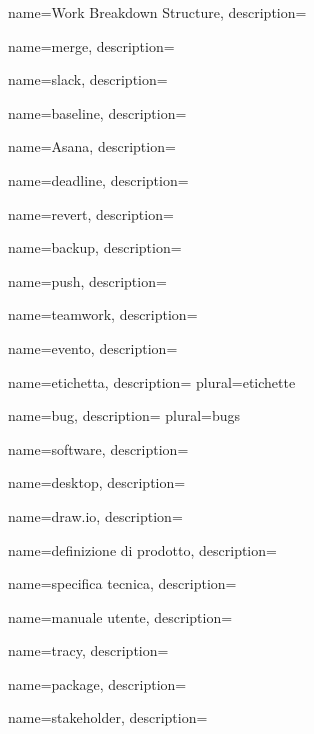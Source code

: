  {
	name=Work Breakdown Structure,
	description={\TODO{}}
}

 {
	name=merge,
	description={\TODO{}}
}

 {
	name=slack,
	description={\TODO{}}
}

 {
	name=baseline,
	description={\TODO{}}
}

 {
	name=Asana,
	description={\TODO{}}
}

 {
	name=deadline,
	description={\TODO{}}
}

 {
	name=revert,
	description={\TODO{}}
}

 {
	name=backup,
	description={\TODO{}}
}

 {
	name=push,
	description={\TODO{}}
}

 {
	name=teamwork,
	description={\TODO{}}
}

 {
	name=evento,
	description={\TODO{}}
}

 {
	name=etichetta,
	description={\TODO{}}
	plural=etichette
}

 {
	name=bug,
	description={\TODO{}}
	plural=bugs
}

 {
	name=software,
	description={\TODO{}}
}

 {
	name=desktop,
	description={\TODO{}}
}

 {
	name=draw.io,
	description={\TODO{}}
}

 {
	name=definizione di prodotto,
	description={\TODO{}}
}

 {
	name=specifica tecnica,
	description={\TODO{}}
}

 {
	name=manuale utente,
	description={\TODO{}}
}

 {
	name=tracy,
	description={\TODO{}}
}

 {
	name=package,
	description={\TODO{}}
}

 {
	name=stakeholder,
	description={\TODO{}}
}
